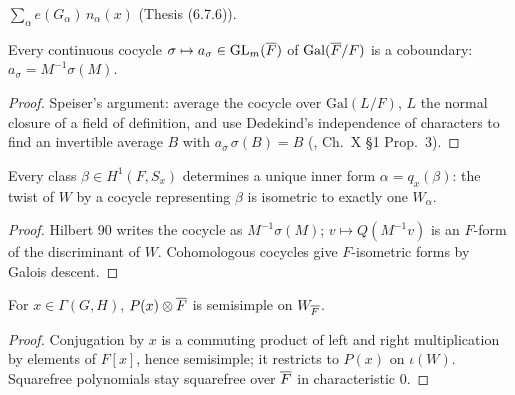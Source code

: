\begin{definition}
\label{signedCount}
\leanok
{}
$\sum_\alpha e(G_\alpha)\,n_\alpha(x)$ (Thesis (6.7.6)).
\end{definition}

\begin{theorem}
\label{hilbert90_GL}
\leanok
Every continuous cocycle $\sigma\mapsto a_\sigma\in\mathrm{GL}_m(\overline{F})$ of $\mathrm{Gal}(\overline{F}/F)$ is a coboundary:
$a_\sigma=M^{-1}\sigma(M)$.
\end{theorem}
\begin{proof}
\leanok
Speiser's argument: average the cocycle over $\mathrm{Gal}(L/F)$, $L$ the normal closure of a field of definition, and use Dedekind's independence of characters to find an invertible average $B$ with $a_\sigma\,\sigma(B)=B$ (\cite{SerreLF}, Ch.~X \S1 Prop.~3).
\end{proof}

\begin{lemma}
\label{existsUnique_twistIdx}
\leanok
{}
Every class $\beta\in H^1(F,S_x)$ determines a unique inner form $\alpha=q_x(\beta)$: the twist of $W$ by a
cocycle representing $\beta$ is isometric to exactly one $W_\alpha$.
\end{lemma}
\begin{proof}
\leanok
{}
Hilbert 90 writes the cocycle as $M^{-1}\sigma(M)$; $v\mapsto Q(M^{-1}v)$ is an $F$-form of the discriminant of $W$. Cohomologous cocycles give $F$-isometric forms by Galois descent.
\end{proof}

\begin{lemma}
\label{isSemisimple_specP_baseChange}
\leanok
{}
For $x\in\Gamma(G,H)$, $P(x)\otimes\overline{F}$ is semisimple on $W_{\overline{F}}$.
\end{lemma}
\begin{proof}
\leanok
Conjugation by $x$ is a commuting product of left and right multiplication by elements of $F[x]$, hence semisimple; it restricts to $P(x)$ on $\iota(W)$. Squarefree polynomials stay squarefree over $\overline{F}$ in characteristic $0$.
\end{proof}

